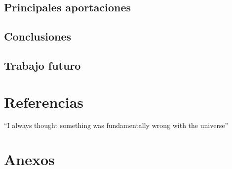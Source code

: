 \documentclass{article}
\begin{document}
    \subsection{Principales aportaciones}




    \subsection{Conclusiones}



    \subsection{Trabajo futuro}


\section{Referencias}
``I always thought something was fundamentally wrong with the universe'' \citep{adams1995hitchhiker}











\section{Anexos}
\end{document}
